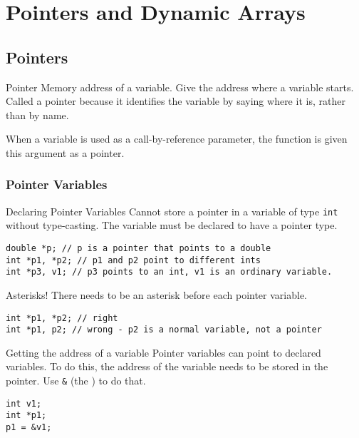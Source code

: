 \documentclass[\main/notes.tex]{subfiles}
\begin{document}
	\setcounter{chapter}{3}
	\chapter{Pointers and Dynamic Arrays}
		\section{Pointers}
			\begin{definition}{Pointer}
				Memory address of a variable. Give the address where a variable starts. Called a pointer because it identifies the variable by saying where it is, rather than by name.

				When a variable is used as a call-by-reference parameter, the function is given this argument as a pointer.
			\end{definition}
			\subsection{Pointer Variables}
				\begin{definition}{Declaring Pointer Variables}
					Cannot store a pointer in a variable of type \texttt{int} without type-casting. The variable must be declared to have a pointer type.
					\begin{verbatim}
double *p; // p is a pointer that points to a double
int *p1, *p2; // p1 and p2 point to different ints
int *p3, v1; // p3 points to an int, v1 is an ordinary variable.
					\end{verbatim}
				\end{definition}
				\begin{sidenote}{Asterisks!}
					There needs to be an asterisk before each pointer variable.
					\begin{verbatim}
int *p1, *p2; // right
int *p1, p2; // wrong - p2 is a normal variable, not a pointer
					\end{verbatim}
				\end{sidenote}
				\begin{definition}{Getting the address of a variable}
					Pointer variables can point to declared variables. To do this, the address of the variable needs to be stored in the pointer. Use \texttt{&} (the ) to do that.
					\begin{verbatim}
int v1;
int *p1;
p1 = &v1;
					\end{verbatim}
				\end{definition}
\end{document}
